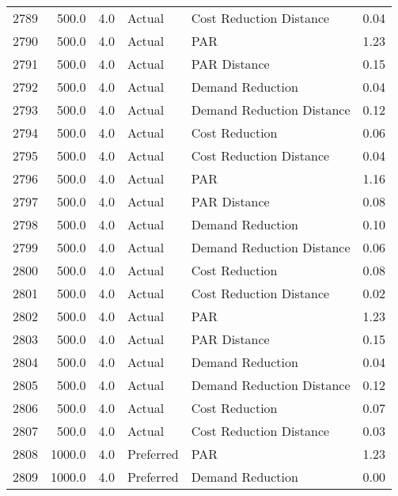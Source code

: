 \begin{longtable}{lrrllr}
2789 &        500.0 &     4.0 &         Actual &    Cost Reduction Distance &   0.04 \\
2790 &        500.0 &     4.0 &         Actual &                        PAR &   1.23 \\
2791 &        500.0 &     4.0 &         Actual &               PAR Distance &   0.15 \\
2792 &        500.0 &     4.0 &         Actual &           Demand Reduction &   0.04 \\
2793 &        500.0 &     4.0 &         Actual &  Demand Reduction Distance &   0.12 \\
2794 &        500.0 &     4.0 &         Actual &             Cost Reduction &   0.06 \\
2795 &        500.0 &     4.0 &         Actual &    Cost Reduction Distance &   0.04 \\
2796 &        500.0 &     4.0 &         Actual &                        PAR &   1.16 \\
2797 &        500.0 &     4.0 &         Actual &               PAR Distance &   0.08 \\
2798 &        500.0 &     4.0 &         Actual &           Demand Reduction &   0.10 \\
2799 &        500.0 &     4.0 &         Actual &  Demand Reduction Distance &   0.06 \\
2800 &        500.0 &     4.0 &         Actual &             Cost Reduction &   0.08 \\
2801 &        500.0 &     4.0 &         Actual &    Cost Reduction Distance &   0.02 \\
2802 &        500.0 &     4.0 &         Actual &                        PAR &   1.23 \\
2803 &        500.0 &     4.0 &         Actual &               PAR Distance &   0.15 \\
2804 &        500.0 &     4.0 &         Actual &           Demand Reduction &   0.04 \\
2805 &        500.0 &     4.0 &         Actual &  Demand Reduction Distance &   0.12 \\
2806 &        500.0 &     4.0 &         Actual &             Cost Reduction &   0.07 \\
2807 &        500.0 &     4.0 &         Actual &    Cost Reduction Distance &   0.03 \\
2808 &       1000.0 &     4.0 &      Preferred &                        PAR &   1.23 \\
2809 &       1000.0 &     4.0 &      Preferred &           Demand Reduction &   0.00 \\

\end{longtable}
